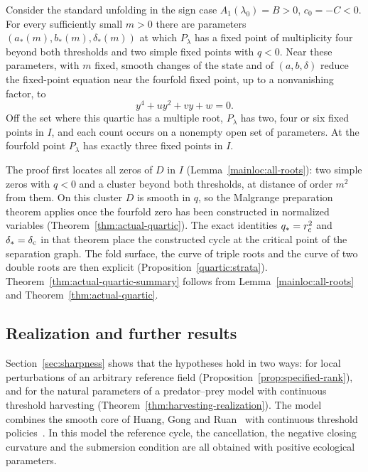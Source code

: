 \begin{theorem}\label{thm:actual-quartic-summary}
Consider the standard unfolding in the sign case $A_1(\lambda_0)=B>0$,
$c_0=-C<0$. For every sufficiently small $m>0$ there are parameters
$(a_*(m),b_*(m),\delta_*(m))$ at which $P_\lambda$ has a fixed point of
multiplicity four beyond both thresholds and two simple fixed points with
$q<0$. Near these parameters, with $m$ fixed, smooth changes of the state and
of $(a,b,\delta)$ reduce the fixed-point equation near the fourfold fixed
point, up to a nonvanishing factor, to
\[
 y^4+uy^2+vy+w=0.
\]
Off the set where this quartic has a multiple root, $P_\lambda$ has two, four
or six fixed points in $I$, and each count occurs on a nonempty open set of
parameters. At the fourfold point $P_\lambda$ has exactly three fixed points
in $I$.
\end{theorem}

The proof first locates all zeros of $D$ in $I$
(Lemma~\ref{mainloc:all-roots}): two simple zeros with $q<0$ and a cluster
beyond both thresholds, at distance of order $m^2$ from them. On this cluster
$D$ is smooth in $q$, so the Malgrange preparation theorem applies once the
fourfold zero has been constructed in normalized variables
(Theorem~\ref{thm:actual-quartic}). The exact identities $q_*=r_{\rm c}^2$
and $\delta_*=\delta_{\rm c}$ in that theorem place the constructed cycle at
the critical point of the separation graph. The fold surface, the curve of triple roots
and the curve of two double roots are then explicit
(Proposition~\ref{quartic:strata}). Theorem~\ref{thm:actual-quartic-summary}
follows from Lemma~\ref{mainloc:all-roots} and Theorem~\ref{thm:actual-quartic}.

\subsection{Realization and further results}

Section~\ref{sec:sharpness} shows that the hypotheses hold in two ways: for
local perturbations of an arbitrary reference field
(Proposition~\ref{prop:specified-rank}), and for the natural parameters of a
predator--prey model with continuous threshold harvesting
(Theorem~\ref{thm:harvesting-realization}). The model combines the smooth core
of Huang, Gong and Ruan~\cite{huang2013} with continuous threshold
policies~\cite{bohn2011,leardrebaza2011,rebaza2012,onana2019}. In this model
the reference cycle, the cancellation, the negative closing curvature and the
submersion condition are all obtained with positive ecological parameters.


